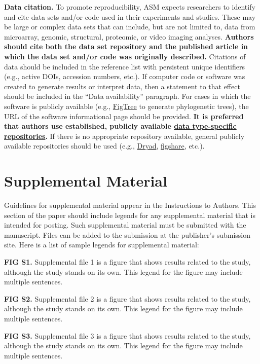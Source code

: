 \documentclass[lineno]{asm-article}
\begin{document}
\textbf{Data citation.}
To promote reproducibility, ASM expects researchers to identify and cite data sets and/or code used in their experiments and studies. These may be large or complex data sets that can include, but are not limited to, data from microarray, genomic, structural, proteomic, or video imaging analyses. \textbf{Authors should cite both the data set repository and the published article in which the data set and/or code was originally described.} Citations of data should be included in the reference list with persistent unique identifiers (e.g., active DOIs, accession numbers, etc.). If computer code or software was created to generate results or interpret data, then a statement to that effect should be included in the ``Data availability'' paragraph. For cases in which the software is publicly available (e.g., \href{http://tree.bio.ed.ac.uk/software/figtree/}{FigTree} to generate phylogenetic trees), the URL of the software informational page should be provided. \textbf{It is preferred that authors use established, publicly available \href{https://journals.asm.org/list-data-repositories}{data type-specific repositories}.} If there is no appropriate repository available, general publicly available repositories should be used (e.g., \href{https://datadryad.org/stash}{Dryad}, \href{https://figshare.com/}{figshare}, etc.).

\section{Supplemental Material}
Guidelines for supplemental material appear in the Instructions to Authors. This section of the paper should include legends for any supplemental material that is intended for posting. Such supplemental material must be submitted with the manuscript. Files can be added to the submission at the publisher's submission site. Here is a list of sample legends for supplemental material:

\textbf{FIG S1.} Supplemental file 1 is a figure that shows results related to the study, although the study stands on its own. This legend for the figure may include multiple sentences.

\textbf{FIG S2.} Supplemental file 2 is a figure that shows results related to the study, although the study stands on its own. This legend for the figure may include multiple sentences.

\textbf{FIG S3.} Supplemental file 3 is a figure that shows results related to the study, although the study stands on its own. This legend for the figure may include multiple sentences.
\end{document}
